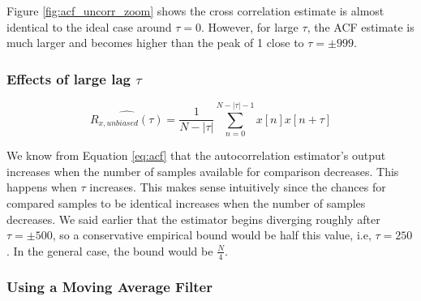 \documentclass{article}
\begin{document}
Figure \ref{fig:acf_uncorr_zoom} shows the cross correlation estimate is almost identical to the ideal case around $\tau=0$. However, for large $\tau$, the ACF estimate is much larger and becomes higher than the peak of 1 close to $\tau=\pm 999$.

\subsubsection{Effects of large lag $\tau$}

\begin{equation}
\hat{R_{x,unbiased}(\tau)}=\frac{1}{N-|\tau|} \sum_{n=0}^{N-|\tau|-1} x[n]x[n+\tau]
\label{eq:acf}
\end{equation}

We know from Equation \ref{eq:acf} that the autocorrelation estimator's output increases when the number of samples available for comparison decreases. This happens when $\tau$ increases. This makes sense intuitively since the chances for compared samples to be identical increases when the number of samples decreases. We said earlier that the estimator begins diverging roughly after $\tau=\pm500$, so a conservative empirical bound would be half this value, i.e, $\tau=250$. In the general case, the bound would be $\frac{N}{4}$.

\subsubsection{Using a Moving Average Filter}
\end{document}
